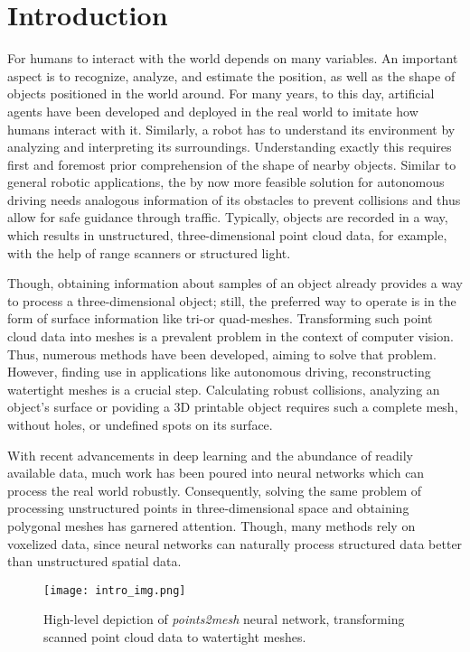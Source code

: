 \chapter{Introduction}
  For humans to interact with the world depends on many variables. 
  An important aspect is to recognize, analyze, and estimate the position,
  as well as the shape of objects positioned in the world around. For many years,
  to this day, artificial agents have been developed and deployed in the real world\cite{1087032,10.1007978-981-13-0224-4_40} 
  to imitate how humans interact with it. Similarly, a robot has to understand its environment
  by analyzing and interpreting its surroundings. Understanding exactly this requires first and 
  foremost prior comprehension of the shape of nearby objects. 
  Similar to general robotic applications, the by now more feasible solution for autonomous driving
  needs analogous information of its obstacles to prevent collisions and thus allow for safe guidance
  through traffic. 
  Typically, objects are recorded in a way, which results in unstructured, three-dimensional point
  cloud data, for example, with the help of range scanners or structured light.

  Though, obtaining information about samples of an object already provides a way to process a three-dimensional object;
  still, the preferred way to operate is in the form of surface information like tri-or quad-meshes.
  Transforming such point cloud data into meshes is a prevalent problem in the context of computer vision. Thus, numerous
  methods have been developed, aiming to solve that problem\cite{817351,Jakob2015Instant}.
  However, finding use in applications like autonomous driving, reconstructing watertight meshes is a crucial step. Calculating robust collisions,
  analyzing an object's surface or poviding a 3D printable object requires such a complete mesh, without holes, or undefined spots on its surface.
 
  With recent advancements in deep learning and the abundance of readily available data, much work has been poured
  into neural networks which can process the real world robustly. Consequently, solving the same problem of processing 
  unstructured points in three-dimensional space and obtaining polygonal meshes has garnered attention. Though, many methods 
  rely on voxelized data, since neural networks can naturally process structured data better than unstructured spatial data.

  \begin{figure}[htbp]
    \centering
    \texttt{[image: intro\_img.png]}
    \caption{High-level depiction of \emph{points2mesh} neural network, transforming scanned point cloud data to watertight meshes.} \label{fig:intro}
  \end{figure}

